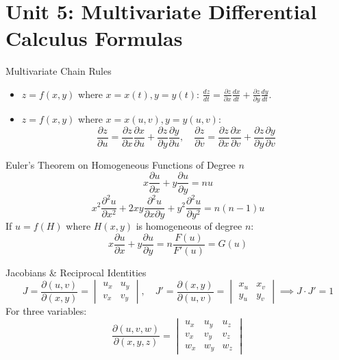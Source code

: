 \chapter{Unit 5: Multivariate Differential Calculus Formulas}

\begin{formulabox}{Multivariate Chain Rules}
\begin{itemize}
    \item $z = f(x, y)$ where $x = x(t), y = y(t)$: $\frac{dz}{dt} = \frac{\partial z}{\partial x}\frac{dx}{dt} + \frac{\partial z}{\partial y}\frac{dy}{dt}$.
    \item $z = f(x, y)$ where $x = x(u,v), y = y(u,v)$:
    \begin{equation*}
    \frac{\partial z}{\partial u} = \frac{\partial z}{\partial x}\frac{\partial x}{\partial u} + \frac{\partial z}{\partial y}\frac{\partial y}{\partial u}, \quad \frac{\partial z}{\partial v} = \frac{\partial z}{\partial x}\frac{\partial x}{\partial v} + \frac{\partial z}{\partial y}\frac{\partial y}{\partial v}
    \end{equation*}
\end{itemize}
\end{formulabox}

\begin{formulabox}{Euler's Theorem on Homogeneous Functions of Degree $n$}
\begin{equation*}
x \frac{\partial u}{\partial x} + y \frac{\partial u}{\partial y} = nu
\end{equation*}
\begin{equation*}
x^2 \frac{\partial^2 u}{\partial x^2} + 2xy \frac{\partial^2 u}{\partial x \partial y} + y^2 \frac{\partial^2 u}{\partial y^2} = n(n-1)u
\end{equation*}
If $u = f(H)$ where $H(x,y)$ is homogeneous of degree $n$:
\begin{equation*}
x \frac{\partial u}{\partial x} + y \frac{\partial u}{\partial y} = n \frac{F(u)}{F'(u)} = G(u)
\end{equation*}
\end{formulabox}

\begin{formulabox}{Jacobians \& Reciprocal Identities}
\begin{equation*}
J = \frac{\partial(u,v)}{\partial(x,y)} = \begin{vmatrix} u_x & u_y \\ v_x & v_y \end{vmatrix}, \quad J' = \frac{\partial(x,y)}{\partial(u,v)} = \begin{vmatrix} x_u & x_v \\ y_u & y_v \end{vmatrix} \implies J \cdot J' = 1
\end{equation*}
For three variables:
\begin{equation*}
\frac{\partial(u,v,w)}{\partial(x,y,z)} = \begin{vmatrix} u_x & u_y & u_z \\ v_x & v_y & v_z \\ w_x & w_y & w_z \end{vmatrix}
\end{equation*}
\end{formulabox}

